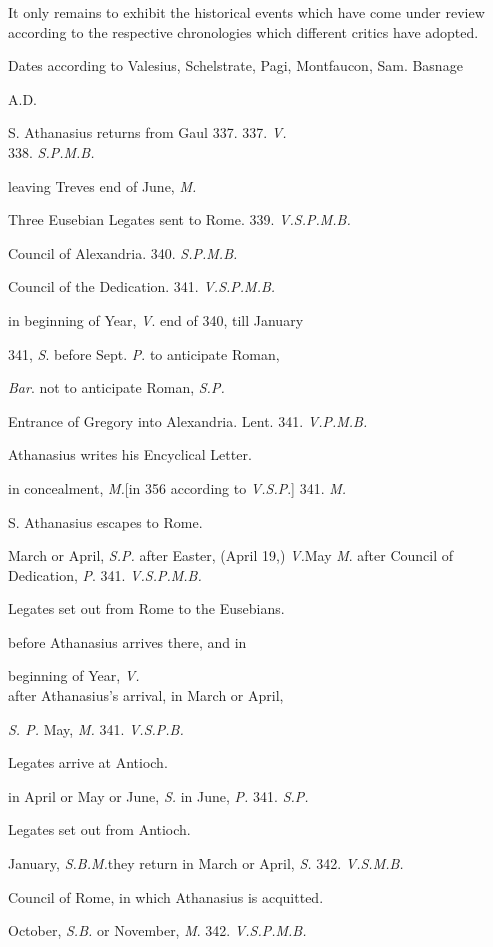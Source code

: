 It only remains to exhibit the
historical events which have come under review according to the
respective chronologies which different critics have adopted.

Dates
according to Valesius, Schelstrate, Pagi, Montfaucon, Sam. Basnage

A.D.

S. Athanasius returns from
Gaul 337.
337. \emph{V.}\\
338. \emph{S.P.M.B.}

leaving
Treves end of June, \emph{M.}

Three Eusebian Legates sent
to Rome.
339. \emph{V.S.P.M.B.}

Council of Alexandria.
340. \emph{S.P.M.B.}

Council of the Dedication.
341. \emph{V.S.P.M.B.}

in beginning of Year, \emph{V}.
end of 340, till January

341, \emph{S}. before Sept.
\emph{P}. to anticipate Roman,

\emph{Bar}. not to anticipate Roman, \emph{S.P.}

Entrance of Gregory into
Alexandria. Lent.
341. \emph{V.P.M.B.}

Athanasius writes his
Encyclical Letter.

in concealment, \emph{M.}[in 356 according to \emph{V.S.P}.]
341. \emph{M.}

S. Athanasius escapes to
Rome.

March or April, \emph{S.P.} after Easter, (April 19,) \emph{V.}May \emph{M}. after Council of
Dedication, \emph{P}.
341. \emph{V.S.P.M.B.}

Legates set out from Rome to
the Eusebians.

before Athanasius arrives there, and in

beginning of Year, \emph{V.}\\
after Athanasius's arrival, in March or April,

\emph{S. P.} May, \emph{M.}
341. \emph{V.S.P.B.}

Legates arrive at Antioch.

in April or May or June, \emph{S.} in June,
\emph{P.}
341. \emph{S.P.}

Legates set out from
Antioch.

January, \emph{S.B.M.}they return in March or April, \emph{S.}
342. \emph{V.S.M.B.}

Council of Rome, in which
Athanasius is acquitted. 

October, \emph{S.B.} or November, \emph{M}.
342. \emph{V.S.P.M.B.}

